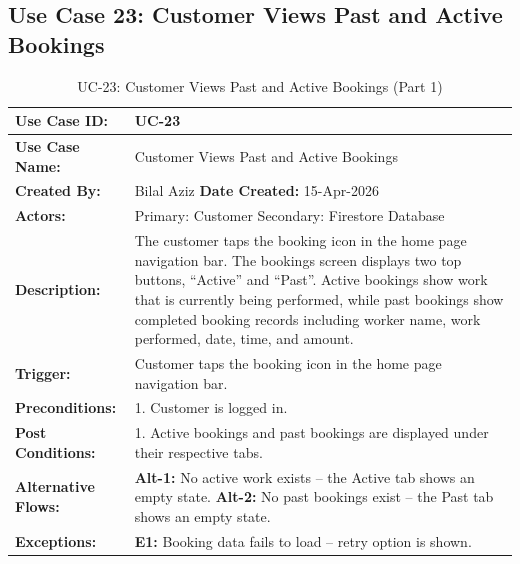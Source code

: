 \newpage

\subsection*{Use Case 23: Customer Views Past and Active Bookings}

{\small
\renewcommand{\arraystretch}{1.05}
\begin{table}[H]
\centering
\begin{tabular}{|p{3cm}|p{11.2cm}|}
\hline
\textbf{Use Case ID:} & UC-23 \\ \hline
\textbf{Use Case Name:} & Customer Views Past and Active Bookings \\ \hline
\textbf{Created By:} & Bilal Aziz \hfill \textbf{Date Created:} 15-Apr-2026 \\ \hline
\textbf{Actors:} & Primary: Customer \quad Secondary: Firestore Database \\ \hline
\textbf{Description:} & The customer taps the booking icon in the home page navigation bar. The bookings screen displays two top buttons, ``Active'' and ``Past''. Active bookings show work that is currently being performed, while past bookings show completed booking records including worker name, work performed, date, time, and amount. \\ \hline
\textbf{Trigger:} & Customer taps the booking icon in the home page navigation bar. \\ \hline
\textbf{Preconditions:} & 1. Customer is logged in. \\ \hline
\textbf{Post Conditions:} & 1. Active bookings and past bookings are displayed under their respective tabs. \\ \hline
\textbf{Alternative Flows:} & \textbf{Alt-1:} No active work exists -- the Active tab shows an empty state. \newline \textbf{Alt-2:} No past bookings exist -- the Past tab shows an empty state. \\ \hline
\textbf{Exceptions:} & \textbf{E1:} Booking data fails to load -- retry option is shown. \\ \hline
\end{tabular}
\caption*{UC-23: Customer Views Past and Active Bookings (Part 1)}
\end{table}
}

\newpage

